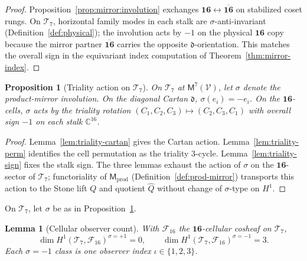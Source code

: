 \documentclass[11pt]{article}
\theoremstyle{plain}
\newtheorem{lemma}[theorem]{Lemma}
\newtheorem{proposition}[theorem]{Proposition}
\theoremstyle{definition}
\theoremstyle{remark}
\numberwithin{equation}{section}
\newcommand{\C}{\mathbb{C}}
\newcommand{\Void}{\mathcal{V}}
\newcommand{\Mirror}{\mathsf{M}}
\begin{document}
\begin{proof}
Proposition~\ref{prop:mirror:involution} exchanges
$\mathbf{16}\leftrightarrow\overline{\mathbf{16}}$ on stabilized coset rungs.
On $\mathcal{T}_7$, horizontal family modes in each stalk are
$\sigma$-anti-invariant (Definition~\ref{def:physical}); the involution acts by
$-1$ on the physical $\mathbf{16}$ copy because the mirror partner
$\overline{\mathbf{16}}$ carries the opposite $\mathfrak{d}$-orientation. This
matches the overall sign in the equivariant index computation of
Theorem~\ref{thm:mirror-index}.
\end{proof}

\begin{proposition}[Triality action on $\mathcal{T}_7$]\label{prop:triality}
On $\mathcal{T}_7$ at $\Mirror^7(\Void)$, let $\sigma$ denote the product-mirror
involution. On the diagonal Cartan $\mathfrak{d}$,
$\sigma(e_i)=-e_i$. On the $\mathbf{16}$-cells,
$\sigma$ acts by the triality rotation $(C_1,C_2,C_3)\mapsto(C_2,C_3,C_1)$
with overall sign $-1$ on each stalk $\C^{16}$.
\end{proposition}

\begin{proof}
Lemma~\ref{lem:triality-cartan} gives the Cartan action.
Lemma~\ref{lem:triality-perm} identifies the cell permutation as the triality
$3$-cycle. Lemma~\ref{lem:triality-sign} fixes the stalk sign.
The three lemmas exhaust the action of $\sigma$ on the
$\mathbf{16}$-sector of $\mathcal{T}_7$; functoriality of
$\Mirror_{\mathrm{prod}}$ (Definition~\ref{def:prod-mirror}) transports this
action to the Stone lift $Q$ and quotient $\hat Q$ without change of
$\sigma$-type on $H^1$.
\end{proof}

On $\mathcal{T}_7$, let $\sigma$ be as in Proposition~\ref{prop:triality}.

\begin{lemma}[Cellular observer count]\label{lem:cellular}
With $\mathcal{F}_{16}$ the $\mathbf{16}$-cellular cosheaf on $\mathcal{T}_7$,
\begin{equation}\label{eq:cellular}
  \dim H^1(\mathcal{T}_7,\mathcal{F}_{16})^{\sigma=+1}=0,
  \qquad
  \dim H^1(\mathcal{T}_7,\mathcal{F}_{16})^{\sigma=-1}=3.
\end{equation}
Each $\sigma=-1$ class is one observer index $\iota\in\{1,2,3\}$.
\end{lemma}
\end{document}
